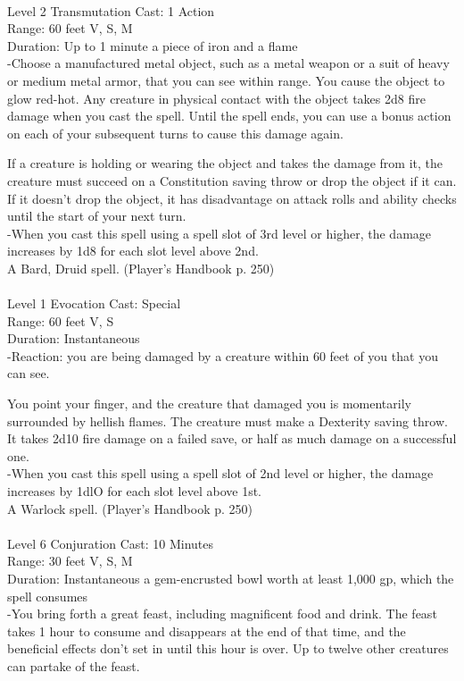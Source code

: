\documentclass[10pt,twocolumn]{report}
\begin{document}
 \\
Level 2 \quad Transmutation \quad Cast: 1 Action\\
Range: 60 feet \quad V, S, M\\
Duration: Up to 1 minute \quad a piece of iron and a flame\\
-Choose a manufactured metal object, such as a metal weapon or a suit of heavy or medium metal armor, that you can see within range. You cause the object to glow red-hot. Any creature in physical contact with the object takes 2d8 fire damage when you cast the spell. Until the spell ends, you can use a bonus action on each of your subsequent turns to cause this damage again.

If a creature is holding or wearing the object and takes the damage from it, the creature must succeed on a Constitution saving throw or drop the object if it can. If it doesn’t drop the object, it has disadvantage on attack rolls and ability checks until the start of your next turn.\\
-When you cast this spell using a spell slot of 3rd level or higher, the damage increases by 1d8 for each slot level above 2nd.\\
A Bard, Druid spell. (Player's Handbook p. 250) \\


 \\
Level 1 \quad Evocation \quad Cast: Special\\
Range: 60 feet \quad V, S\\
Duration: Instantaneous \quad \\
-Reaction: you are being damaged by a creature within 60 feet of you that you can see.

You point your finger, and the creature that damaged you is momentarily surrounded by hellish flames. The creature must make a Dexterity saving throw. It takes 2d10 fire damage on a failed save, or half as much damage on a successful one.\\
-When you cast this spell using a spell slot of 2nd level or higher, the damage increases by 1dlO for each slot level above 1st.\\
A Warlock spell. (Player's Handbook p. 250) \\


 \\
Level 6 \quad Conjuration \quad Cast: 10 Minutes\\
Range: 30 feet \quad V, S, M\\
Duration: Instantaneous \quad a gem-encrusted bowl worth at least 1,000 gp, which the spell consumes\\
-You bring forth a great feast, including magnificent food and drink. The feast takes 1 hour to consume and disappears at the end of that time, and the beneficial effects don’t set in until this hour is over. Up to twelve other creatures can partake of the feast.
\end{document}
